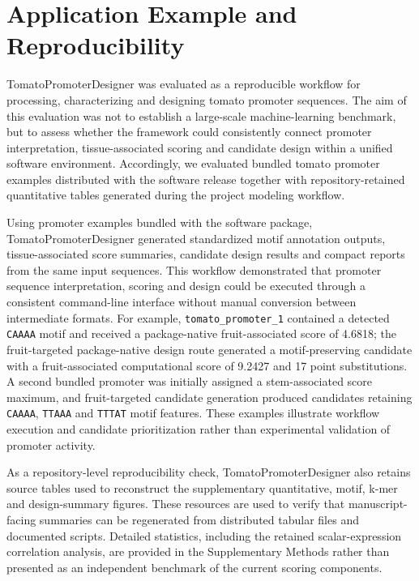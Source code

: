 \documentclass[numsec,webpdf,modern,large]{oup-authoring-template}
\begin{document}
\section{Application Example and Reproducibility}

TomatoPromoterDesigner was evaluated as a reproducible workflow for processing, characterizing and designing tomato promoter sequences. The aim of this evaluation was not to establish a large-scale machine-learning benchmark, but to assess whether the framework could consistently connect promoter interpretation, tissue-associated scoring and candidate design within a unified software environment. Accordingly, we evaluated bundled tomato promoter examples distributed with the software release together with repository-retained quantitative tables generated during the project modeling workflow.

Using promoter examples bundled with the software package, TomatoPromoterDesigner generated standardized motif annotation outputs, tissue-associated score summaries, candidate design results and compact reports from the same input sequences. This workflow demonstrated that promoter sequence interpretation, scoring and design could be executed through a consistent command-line interface without manual conversion between intermediate formats. For example, \texttt{tomato\_promoter\_1} contained a detected \texttt{CAAAA} motif and received a package-native fruit-associated score of 4.6818; the fruit-targeted package-native design route generated a motif-preserving candidate with a fruit-associated computational score of 9.2427 and 17 point substitutions. A second bundled promoter was initially assigned a stem-associated score maximum, and fruit-targeted candidate generation produced candidates retaining \texttt{CAAAA}, \texttt{TTAAA} and \texttt{TTTAT} motif features. These examples illustrate workflow execution and candidate prioritization rather than experimental validation of promoter activity.

As a repository-level reproducibility check, TomatoPromoterDesigner also retains source tables used to reconstruct the supplementary quantitative, motif, k-mer and design-summary figures. These resources are used to verify that manuscript-facing summaries can be regenerated from distributed tabular files and documented scripts. Detailed statistics, including the retained scalar-expression correlation analysis, are provided in the Supplementary Methods rather than presented as an independent benchmark of the current scoring components.
\end{document}
